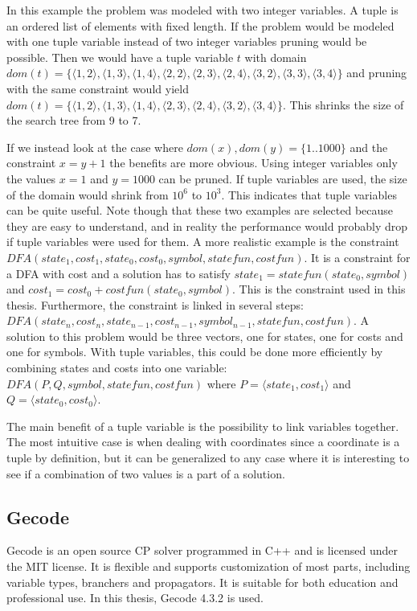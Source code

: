 \documentclass[a4paper,11pt]{article}
\begin{document}
In this example the problem was modeled with two integer variables. A tuple is an ordered list of elements with fixed length. If the problem would be modeled with one tuple variable instead of two integer variables pruning would be possible. Then we would have a tuple variable $t$ with domain $dom(t)=\{\langle1,2\rangle,\langle1,3\rangle,\langle1,4\rangle,\langle2,2\rangle,\langle2,3\rangle,\langle2,4\rangle,\langle3,2\rangle,\langle3,3\rangle,\langle3,4\rangle\}$ and pruning with the same constraint would yield $dom(t)=\{\langle1,2\rangle,\langle1,3\rangle,\langle1,4\rangle,\langle2,3\rangle,\langle2,4\rangle,\langle3,2\rangle,\langle3,4\rangle\}$. This shrinks the size of the search tree from 9 to 7. 

If we instead look at the case where $dom(x),dom(y)=\{1..1000\}$ and the constraint $x=y+1$ the benefits are more obvious. Using integer variables only the values $x=1$ and $y=1000$ can be pruned. If tuple variables are used, the size of the domain would shrink from $10^6$ to $10^3$. This indicates that tuple variables can be quite useful. Note though that these two examples are selected because they are easy to understand, and in reality the performance would probably drop if tuple variables were used for them. A more realistic example is the constraint $DFA(state_1, cost_1, state_0, cost_0, symbol, statefun, costfun)$. It is a constraint for a DFA with cost and a solution has to satisfy $state_1= statefun(state_0, symbol)$ and $cost_1=cost_0+costfun(state_0, symbol)$. This is the constraint used in this thesis. Furthermore, the constraint is linked in several steps: $DFA(state_n, cost_n, state_{n-1}, cost_{n-1}, symbol_{n-1}, statefun, costfun)$. A solution to this problem would be three vectors, one for states, one for costs and one for symbols. With tuple variables, this could be done more efficiently by combining states and costs into one variable: $DFA(P, Q, symbol, statefun, costfun)$ where $P=\langle state_1, cost_1\rangle$ and $Q=\langle state_0, cost_0\rangle$.

The main benefit of a tuple variable is the possibility to link variables together. The most intuitive case is when dealing with coordinates since a coordinate is a tuple by definition, but it can be generalized to any case where it is interesting to see if a combination of two values is a part of a solution. 

\subsection{Gecode}
Gecode is an open source CP solver programmed in C++ and is licensed under the MIT license. It is flexible and supports customization of most parts, including variable types, branchers and propagators. It is suitable for both education and professional use. In this thesis, Gecode 4.3.2 is used.
\end{document}
